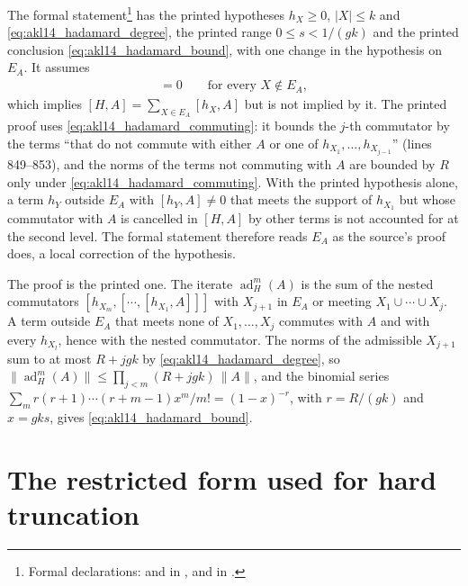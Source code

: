 \documentclass{article}
\begin{document}
The formal statement\footnote{Formal declarations:
     and
     in
    , and
     in
    .}
has the printed hypotheses $h_X\ge0$, $|X|\le k$ and
\eqref{eq:akl14_hadamard_degree}, the printed range $0\le s<1/(gk)$ and the
printed conclusion \eqref{eq:akl14_hadamard_bound}, with one change in the
hypothesis on $E_A$. It assumes
\begin{align}
    [h_X,A]=0\qquad\text{for every }X\notin E_A,
    \label{eq:akl14_hadamard_commuting}
\end{align}
which implies $[H,A]=\sum_{X\in E_A}[h_X,A]$ but is not implied by it. The
printed proof uses \eqref{eq:akl14_hadamard_commuting}: it bounds the
$j$-th commutator by the terms ``that do not commute with either $A$ or one
of $h_{X_1},\dots,h_{X_{j-1}}$'' (lines 849--853), and the norms of the terms
not commuting with $A$ are bounded by $R$ only under
\eqref{eq:akl14_hadamard_commuting}. With the printed hypothesis alone, a
term $h_Y$ outside $E_A$ with $[h_Y,A]\ne0$ that meets the support of $h_{X_1}$
but whose commutator with $A$ is cancelled in $[H,A]$ by other terms is not
accounted for at the second level. The formal statement therefore reads
$E_A$ as the source's proof does, a local correction of the hypothesis.

The proof is the printed one. The iterate $\operatorname{ad}_H^m(A)$ is the
sum of the nested commutators $[h_{X_m},[\cdots,[h_{X_1},A]]]$ with
$X_{j+1}$ in $E_A$ or meeting $X_1\cup\cdots\cup X_j$. A term outside $E_A$
that meets none of $X_1,\dots,X_j$ commutes with $A$ and with every
$h_{X_l}$, hence with the nested commutator. The norms of the admissible
$X_{j+1}$ sum to at most $R+jgk$ by \eqref{eq:akl14_hadamard_degree}, so
$\lVert\operatorname{ad}_H^m(A)\rVert\le\prod_{j<m}(R+jgk)\,\lVert A\rVert$,
and the binomial series
$\sum_m r(r+1)\cdots(r+m-1)x^m/m!=(1-x)^{-r}$, with $r=R/(gk)$ and
$x=gks$, gives \eqref{eq:akl14_hadamard_bound}.

\section{The restricted form used for hard truncation}
\end{document}
